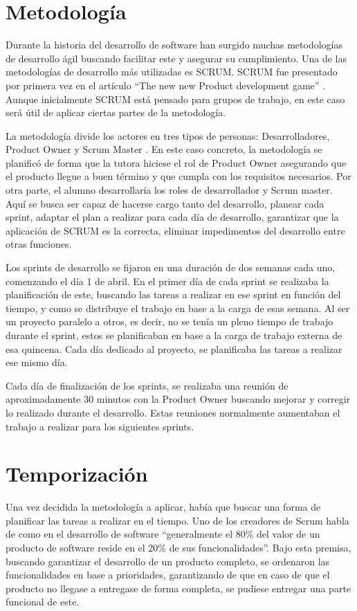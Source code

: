 \section{Metodología}

Durante la historia del desarrollo de software han surgido muchas metodologías de desarrollo ágil buscando facilitar este y asegurar su cumplimiento. Una de las metodologías de desarrollo más utilizadas es SCRUM. SCRUM fue presentado por primera vez en el artículo ``The new new Product development game'' \cite{takeuchi1986new}. Aunque inicialmente SCRUM está pensado para grupos de trabajo, en este caso será útil de aplicar ciertas partes de la metodología.

La metodología divide los actores en tres tipos de personas: Desarrolladores, Product Owner y Scrum Master \cite{schwaber2011scrum}. En este caso concreto, la metodología se planificó de forma que la tutora hiciese el rol de Product Owner asegurando que el producto llegue a buen término y que cumpla con los requisitos necesarios. Por otra parte, el alumno desarrollaría los roles de desarrollador y Scrum master. Aquí se busca ser capaz de hacerse cargo tanto del desarrollo, planear cada sprint, adaptar el plan a realizar para cada día de desarrollo, garantizar que la aplicación de SCRUM es la correcta, eliminar impedimentos del desarrollo entre otras funciones. 

Los sprints de desarrollo se fijaron en una duración de dos semanas cada uno, comenzando el día 1 de abril. En el primer día de cada sprint se realizaba la planificación de este, buscando las tareas a realizar en ese sprint en función del tiempo, y como se distribuye el trabajo en base a la carga de esas semana. Al ser un proyecto paralelo a otros, es decir, no se tenía un pleno tiempo de trabajo durante el sprint, estos se planificaban en base a la carga de trabajo externa de esa quincena. Cada día dedicado al proyecto, se planificaba las tareas a realizar ese mismo día. 

Cada día de finalización de los sprints, se realizaba una reunión de aproximadamente 30 minutos con la Product Owner buscando mejorar y corregir lo realizado durante el desarrollo. Estas reuniones normalmente aumentaban el trabajo a realizar para los siguientes sprints.

\section{Temporización}

Una vez decidida la metodología a aplicar, había que buscar una forma de planificar las tareas a realizar en el tiempo. Uno de los creadores de Scrum habla de como en el desarrollo de software ``generalmente el 80\% del valor de un producto de software reside en el 20\% de sus funcionalidades''\cite{sutherland-2014}. Bajo esta premisa, buscando garantizar el desarrollo de un producto completo, se ordenaron las funcionalidades en base a prioridades, garantizando de que en caso de que el producto no llegase a entregase de forma completa, se pudiese entregar una parte funcional de este.

